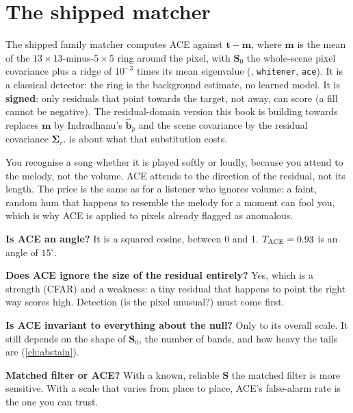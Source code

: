 \documentclass[11pt,a4paper,oneside,openany]{book}
\newcommand{\B}[1]{{\symbf{#1}}}
\newcommand{\B}[1]{{\bm{#1}}}
\newcommand{\vt}{\B{t}}
\newcommand{\vbh}{\hat{\B{b}}}
\newcommand{\vm}{\B{m}}
\newcommand{\mS}{\B{S}}
\newcommand{\mSig}{\B{\Sigma}}
\begin{document}
\section{The shipped matcher}

The shipped family matcher computes ACE against $\vt-\vm$, where $\vm$ is the mean of the $13\times13$-minus-$5\times5$ ring around the pixel, with $\mS_0$ the
whole-scene pixel covariance plus a ridge of $10^{-3}$ times its mean eigenvalue (, \texttt{whitener},
\texttt{ace}). It is a classical detector: the ring is the background estimate, no learned model. It is \textbf{signed}: only residuals that point
towards the target, not away, can score (a fill cannot be negative). The residual-domain version this book is building towards replaces $\vm$ by
Indradhanu's $\vbh_p$ and the scene covariance by the residual covariance $\mSig_r$.  is about what that substitution costs.

\begin{analogy}
You recognise a song whether it is played softly or loudly, because you attend to the melody, not the volume. ACE attends to the direction of
the residual, not its length. The price is the same as for a listener who ignores volume: a faint, random hum that happens to resemble the melody
for a moment can fool you, which is why ACE is applied to pixels already flagged as anomalous.
\end{analogy}

\begin{confusions}
\textbf{Is ACE an angle?} It is a squared cosine, between 0 and 1. $T_{\rm ACE}=0.93$ is an angle of $15^\circ$.

\textbf{Does ACE ignore the size of the residual entirely?} Yes, which is a strength (CFAR) and a weakness: a tiny residual that happens to point
the right way scores high. Detection (is the pixel unusual?) must come first.

\textbf{Is ACE invariant to everything about the null?} Only to its overall scale. It still depends on the shape of $\mS_0$, the number of bands, and
how heavy the tails are (\cref{ch:abstain}).

\textbf{Matched filter or ACE?} With a known, reliable $\mS$ the matched filter is more sensitive. With a scale that varies from place to place, ACE's
false-alarm rate is the one you can trust.
\end{confusions}
\end{document}
